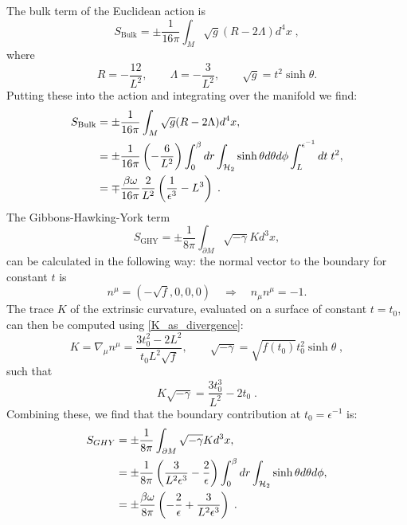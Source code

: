 The bulk term of the Euclidean action is 
\begin{equation*}
    S_{\text{Bulk}} = \pm \frac{1}{16 \pi} \int_M \sqrt{g} (R-2\Lambda) d^4 x \;,
\end{equation*}
where
\begin{equation*}
    R = -\frac{12}{L^2}, \qquad \Lambda = -\frac{3}{L^2}, \qquad \sqrt{g} = t^2 \sinh \theta.
\end{equation*}
Putting these into the action and integrating over the manifold we find:
\begin{equation*}
    \begin{aligned}
        S_{\text{Bulk}} &= \pm \frac{1}{16 \pi} \int_M \sqrt{g} (R-2\Lambda)  d^4 x ,\\
        &= \pm \frac{1}{16 \pi} \left( -\frac{6}{L^2} \right) \int_0^\beta dr \int_{{\cal H}_2} \sinh \theta d\theta d\phi \int_L^{\epsilon^{-1}} dt \; t^2,\\
        &= \mp \frac{\beta \omega}{16 \pi} \frac{2}{L^2} \left(\frac{1}{\epsilon^3} - L^3\right) \;.
    \end{aligned} 
\end{equation*}
The Gibbons-Hawking-York term 
\begin{equation*}
    S_{\text{GHY}} =  \pm \frac{1}{8 \pi} \int_{\partial M} \sqrt{-\gamma} K d^3x,
\end{equation*}
can be calculated in the following way: the normal vector to the boundary for constant $t$ is
\begin{equation*}
    n^\mu = \left(- \sqrt{f}, 0, 0, 0 \right) \quad \Rightarrow \quad n_\mu n^\mu = -1.
\end{equation*}
The trace $K$ of the extrinsic curvature, evaluated on a surface of constant $t = t_0$, can then be computed using \eqref{K_as_divergence}:
\begin{equation*}
    K = \nabla_\mu n^\mu = \frac{3t_0^2 - 2L^2}{t_0 L^2 \sqrt{f}}, \qquad \sqrt{- \gamma} = \sqrt{f(t_0)} t_0^2 \sinh \theta
     \;,
\end{equation*}
such that 
\begin{equation*}
    K \sqrt{-\gamma} = \frac{3 t_0^3}{L^2} - 2t_0 \; .
\end{equation*}
Combining these, we find that the boundary contribution at $t_0 = \epsilon^{-1}$ is:
\begin{equation*}
    \begin{aligned}
        S_{GHY} &=  \pm \frac{1}{8 \pi} \int_{\partial M} \sqrt{-\gamma} K d^3x ,\\
        &= \pm \frac{1}{8 \pi} \left(\frac{3}{L^2 \epsilon^3} - \frac{2}{\epsilon} \right) \int_0^\beta dr \int_{{\cal H}_2} \sinh \theta d\theta d\phi , \\
        &= \pm \frac{\beta \omega}{8 \pi} \left(- \frac{2}{\epsilon} + \frac{3}{L^2 \epsilon^3}\right)  \;.
    \end{aligned}
\end{equation*}
